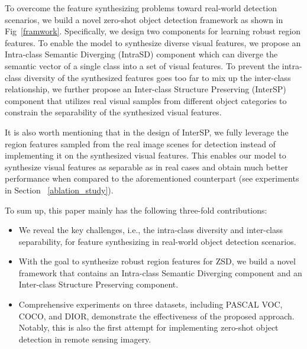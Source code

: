\documentclass[10pt,twocolumn,letterpaper]{article}
\begin{document}
	






To overcome the feature synthesizing problems toward real-world detection scenarios, we build a novel zero-shot object detection framework as shown in Fig~\ref{framwork}. Specifically, we design two components for learning robust region features. To enable the model to synthesize diverse visual features, we propose an Intra-class Semantic Diverging (IntraSD) component which can diverge the semantic vector of a single class into a set of visual features. To prevent the intra-class diversity of the synthesized features goes too far to mix up the inter-class relationship, we further propose an Inter-class Structure Preserving (InterSP) component that utilizes real visual samples from different object categories to constrain the separability of the synthesized visual features.

It is also worth mentioning that in the design of InterSP, we fully leverage the region features sampled from the real image scenes for detection instead of implementing it on the synthesized visual features. This enables our model to synthesize visual features as separable as in real cases and obtain much better performance when compared to the aforementioned counterpart (see experiments in Section ~\ref{ablation_study}).





To sum up, this paper mainly has the following three-fold contributions:
	\begin{itemize}
		\item We reveal the key challenges, i.e., the intra-class diversity and inter-class separability, for feature synthesizing in real-world object detection scenarios.
		\item With the goal to synthesize robust region features for ZSD, we build a novel framework that contains an Intra-class Semantic Diverging component and an Inter-class Structure Preserving component.
		\item Comprehensive experiments on three datasets, including PASCAL VOC, COCO, and DIOR, demonstrate the effectiveness of the proposed approach. Notably, this is also the first attempt for implementing zero-shot object detection in remote sensing imagery.
	\end{itemize}
\end{document}

